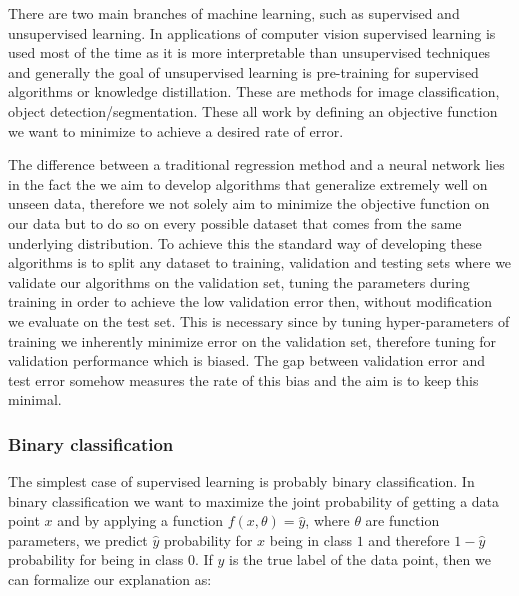 \documentclass[a4paper,12pt]{article}
\begin{document}
\vspace{4mm}

\par There are two main branches of machine learning, such as supervised and unsupervised learning. In applications of computer vision supervised learning is used most of the time as it is more interpretable than unsupervised techniques and generally the goal of unsupervised learning is pre-training for supervised algorithms or knowledge distillation. These are methods for image classification, object detection/segmentation. These all work by defining an objective function we want to minimize to achieve a desired rate of error. 

\vspace{4mm}

\par The difference between a traditional regression method and a neural network lies in the fact the we aim to develop algorithms that generalize extremely well on unseen data, therefore we not solely aim to minimize the objective function on our data but to do so on every possible dataset that comes from the same underlying distribution. To achieve this the standard way of developing these algorithms is to split any dataset to training, validation and testing sets where we validate our algorithms on the validation set, tuning the parameters during training in order to achieve the low validation error then, without modification we evaluate on the test set. This is necessary since by tuning hyper-parameters of training we inherently minimize error on the validation set, therefore tuning for validation performance which is biased. The gap between validation error and test error somehow measures the rate of this bias and the aim is to keep this minimal.

\subsubsection{Binary classification}

\vspace{4mm}

\par The simplest case of supervised learning is probably binary classification. In binary classification we want to maximize the joint probability of getting a data point $x$ and by applying a function $f(x, \theta) = \hat{y}$, where $\theta$ are function parameters, we predict $\hat{y}$ probability for $x$ being in class $1$ and therefore $1 - \hat{y}$ probability for being in class $0$. If $y$ is the true label of the data point, then we can formalize our explanation as:
\end{document}
